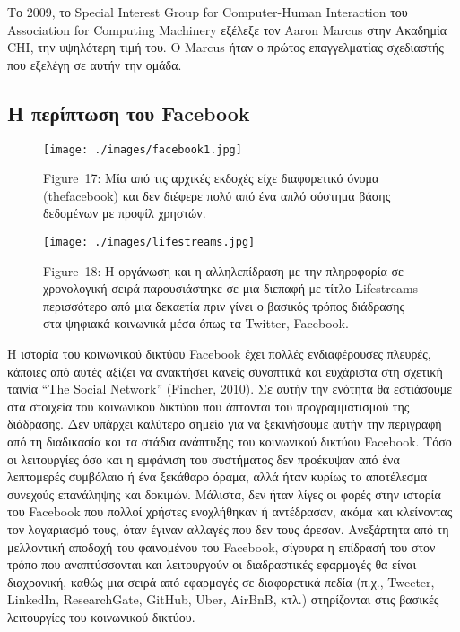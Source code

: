 \documentclass[
]{article}
\begin{document}
Το 2009, το Special Interest Group for Computer-Human Interaction του
Association for Computing Machinery εξέλεξε τον Aaron Marcus στην
Ακαδημία CHI, την υψηλότερη τιμή του. Ο Marcus ήταν ο πρώτος
επαγγελματίας σχεδιαστής που εξελέγη σε αυτήν την ομάδα.

\hypertarget{ux3b7-ux3c0ux3b5ux3c1ux3afux3c0ux3c4ux3c9ux3c3ux3b7-ux3c4ux3bfux3c5-facebook}{%
\subsection{Η περίπτωση του
Facebook}\label{ux3b7-ux3c0ux3b5ux3c1ux3afux3c0ux3c4ux3c9ux3c3ux3b7-ux3c4ux3bfux3c5-facebook}}

\leavevmode{}%
\begin{figure}
\hypertarget{fig:facebook1}{%
\centering
\texttt{[image: ./images/facebook1.jpg]}
\caption{Figure~17: Μία από τις αρχικές εκδοχές είχε διαφορετικό όνομα
(thefacebook) και δεν διέφερε πολύ από ένα απλό σύστημα βάσης δεδομένων
με προφίλ χρηστών.}\label{fig:facebook1}
}
\end{figure}

\leavevmode{}%
\begin{figure}
\hypertarget{fig:lifestreams}{%
\centering
\texttt{[image: ./images/lifestreams.jpg]}
\caption{Figure~18: Η οργάνωση και η αλληλεπίδραση με την πληροφορία σε
χρονολογική σειρά παρουσιάστηκε σε μια διεπαφή με τίτλο Lifestreams
περισσότερο από μια δεκαετία πριν γίνει ο βασικός τρόπος διάδρασης στα
ψηφιακά κοινωνικά μέσα όπως τα Twitter,
Facebook.}\label{fig:lifestreams}
}
\end{figure}

Η ιστορία του κοινωνικού δικτύου Facebook έχει πολλές ενδιαφέρουσες
πλευρές, κάποιες από αυτές αξίζει να ανακτήσει κανείς συνοπτικά και
ευχάριστα στη σχετική ταινία ``The Social Network'' (Fincher, 2010). Σε
αυτήν την ενότητα θα εστιάσουμε στα στοιχεία του κοινωνικού δικτύου που
άπτονται του προγραμματισμού της διάδρασης. Δεν υπάρχει καλύτερο σημείο
για να ξεκινήσουμε αυτήν την περιγραφή από τη διαδικασία και τα στάδια
ανάπτυξης του κοινωνικού δικτύου Facebook. Τόσο οι λειτουργίες όσο και η
εμφάνιση του συστήματος δεν προέκυψαν από ένα λεπτομερές συμβόλαιο ή ένα
ξεκάθαρο όραμα, αλλά ήταν κυρίως το αποτέλεσμα συνεχούς επανάληψης και
δοκιμών. Μάλιστα, δεν ήταν λίγες οι φορές στην ιστορία του Facebook που
πολλοί χρήστες ενοχλήθηκαν ή αντέδρασαν, ακόμα και κλείνοντας τον
λογαριασμό τους, όταν έγιναν αλλαγές που δεν τους άρεσαν. Ανεξάρτητα από
τη μελλοντική αποδοχή του φαινομένου του Facebook, σίγουρα η επίδρασή
του στον τρόπο που αναπτύσσονται και λειτουργούν οι διαδραστικές
εφαρμογές θα είναι διαχρονική, καθώς μια σειρά από εφαρμογές σε
διαφορετικά πεδία (π.χ., Tweeter, LinkedIn, ResearchGate, GitHub, Uber,
AirBnB, κτλ.) στηρίζονται στις βασικές λειτουργίες του κοινωνικού
δικτύου.
\end{document}
